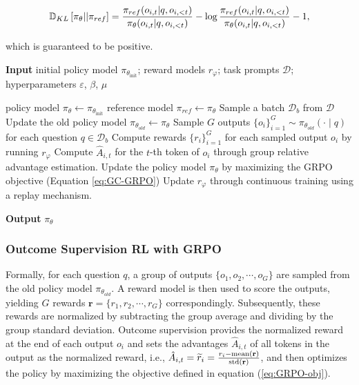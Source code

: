 \begin{equation}
\small
    \mathbb{D}_{KL}\left[\pi_{\theta} || \pi_{ref}\right] = \frac{\pi_{ref}(o_{i,t}|q,o_{i,<t})}{\pi_{\theta}(o_{i,t}|q,o_{i,<t})}- \log\frac{\pi_{ref}(o_{i,t}|q,o_{i,<t})}{\pi_{\theta}(o_{i,t}|q,o_{i,<t})} - 1,
\end{equation}

which is guaranteed to be positive.

\begin{algorithm}[t]
  \small
  \caption{Iterative Group Relative Policy Optimization}
  \textbf{Input} initial policy model $\pi_{\theta_{\text{init}}}$; reward models $r_\varphi$; task prompts $\mathcal{D}$; 
  hyperparameters $\varepsilon$, $\beta$, $\mu$
  \begin{algorithmic}[1]
    \State policy model $\pi_\theta \leftarrow \pi_{\theta_{\text{init}}}$
       \State reference model $\pi_{ref} \leftarrow \pi_{\theta}$
      \State Sample a batch $\mathcal{D}_b$ from $\mathcal{D}$
      \State Update the old policy model $\pi_{\theta_{old}} \leftarrow \pi_{\theta}$ 
      \State Sample $G$ outputs $\{o_i\}_{i=1}^G \sim \pi_{\theta_{old}} (\cdot \mid q) $ for each question $q \in \mathcal{D}_b$
      \State Compute rewards $\{r_i\}_{i=1}^{G}$ for each sampled output $o_i$ by running $r_{\varphi}$ 
      \State Compute $\hat{A}_{i,t}$ for the $t$-th token of $o_i$ through group relative advantage estimation.
        \State Update the policy model $\pi_{\theta}$ by maximizing the GRPO objective (Equation \ref{eq:GC-GRPO})
      \EndFor
    \EndFor \State Update $r_\varphi$ through continuous training using a replay mechanism. 
    \EndFor 
  \end{algorithmic}
  \textbf{Output} $\pi_\theta$
  \label{alg:iter-grpo}
\end{algorithm}

\subsubsection{Outcome Supervision RL with GRPO} Formally, for each question $q$,  a group of outputs $\{o_1, o_2, \cdots, o_G\}$  are sampled from the old policy model $\pi_{\theta_{old}}$. A reward model is then used to score the outputs, yielding $G$ rewards  $\mathbf{r}=\{r_1, r_2, \cdots, r_G\}$ correspondingly. Subsequently, these rewards are normalized by subtracting the group average and dividing by the group standard deviation. Outcome supervision provides the normalized reward at the end of each output $o_i$  and sets the advantages  $\hat{A}_{i, t}$  of all tokens in the output as the normalized reward, i.e., $\hat{A}_{i, t} = \widetilde{r}_i = \frac{r_i- {\rm mean}(\mathbf{r})}{{\rm std}(\mathbf{r})}$, and then optimizes the policy by maximizing the objective defined in equation (\ref{eq:GRPO-obj}).

